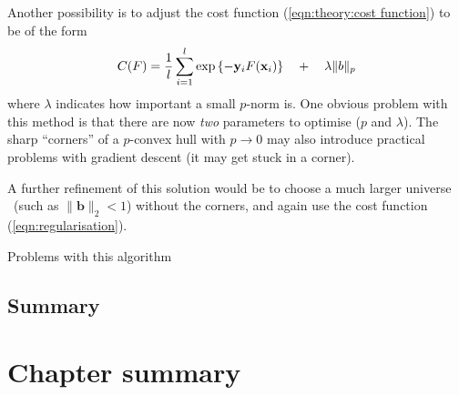   Another possibility is to adjust the cost function
(\ref{eqn:theory:cost function}) to be of the form
%
\begin{equation}
C(F) = \frac{1}{l} \sum_{i=1}^{l} \exp
\left\{ -\mathbf{y}_iF(\mathbf{x}_i) \right\} \quad + \quad \lambda \|b\|_p
\label{eqn:regularisation}
\end{equation}
%
where $\lambda$ indicates how important a small $p$-norm is.  One
obvious problem with this method is that there are now \emph{two}
parameters to optimise ($p$ and $\lambda$).  The sharp ``corners'' of a
$p$-convex hull with $p \rightarrow 0$ may also introduce practical
problems with gradient descent (it may get stuck in a corner).

A further refinement of this solution would be to choose a much larger
universe \calX\ (such as $\|\mathbf{b}\|_2 < 1$) without the corners,
and again use the cost function (\ref{eqn:regularisation}).

Problems with this algorithm

\subsection{Summary}

\section{Chapter summary}



